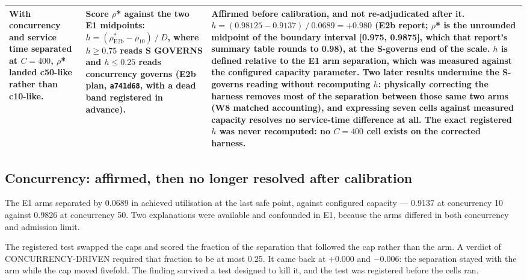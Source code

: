 \documentclass{ieeeaccess}
\begin{document}
\begin{table}[!t]
\begin{tabularx}{\textwidth}{>{\raggedright\arraybackslash}X>{\raggedright\arraybackslash}X>{\raggedright\arraybackslash}X}
{\bfseries Service time governed the boundary.} With concurrency and service time separated at $C = 400$, $\rho$* landed c50-like rather than c10-like. & Score $\rho$* against the two E1 midpoints: $h = (\rho^{*}_{\mathrm{E2b}} - \rho_{10}) \mathbin{/} D$, where {\bfseries $h \geq 0.75$ reads S GOVERNS} and $h \leq 0.25$ reads concurrency governs (E2b plan, \texttt{a741d68}, with a dead band registered in advance). & {\bfseries Affirmed before calibration, and not re-adjudicated after it.} $h = (0.98125 - 0.9137) \mathbin{/} 0.0689 = +0.980$ (E2b report; $\rho$* is the unrounded midpoint of the boundary interval [0.975, 0.9875], which that report's summary table rounds to 0.98), at the S-governs end of the scale. $h$ is defined relative to the E1 arm separation, which was measured against the configured capacity parameter. Two later results undermine the S-governs reading without recomputing $h$: physically correcting the harness removes most of the separation between those same two arms (W8 matched accounting), and expressing seven cells against measured capacity resolves no service-time difference at all. {\bfseries The exact registered $h$ was never recomputed: no $C = 400$ cell exists on the corrected harness.} \\
\hline
\end{tabularx}
\end{table}

\subsection{Concurrency: affirmed, then no longer resolved after calibration}

The E1 arms separated by 0.0689 in achieved utilisation at the last safe point, against configured capacity --- 0.9137 at concurrency 10 against 0.9826 at concurrency 50. Two explanations were available and confounded in E1, because the arms differed in both concurrency and admission limit.

The registered test swapped the caps and scored the fraction of the separation that followed the cap rather than the arm. A verdict of CONCURRENCY-DRIVEN required that fraction to be at most 0.25. It came back at +0.000 and $-$0.006: the separation stayed with the arm while the cap moved fivefold. The finding survived a test designed to kill it, and the test was registered before the cells ran.
\end{document}
